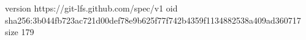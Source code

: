 version https://git-lfs.github.com/spec/v1
oid sha256:3b044fb723ac721d00def78e9b625f77f742b4359f1134882538a409ad360717
size 179
